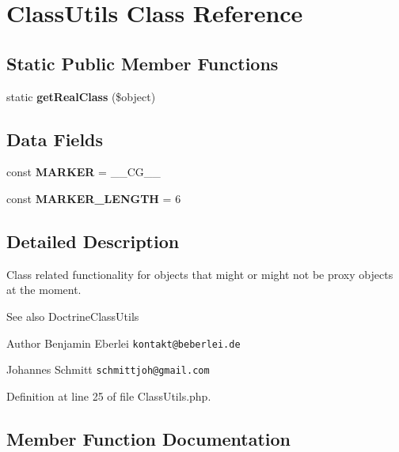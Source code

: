 \section{Class\+Utils Class Reference}
\label{class_symfony_1_1_component_1_1_security_1_1_core_1_1_util_1_1_class_utils}
\subsection*{Static Public Member Functions}
\begin{DoxyCompactItemize}
\item 
static {\bf get\+Real\+Class} (\$object)
\end{DoxyCompactItemize}
\subsection*{Data Fields}
\begin{DoxyCompactItemize}
\item 
const {\bf M\+A\+R\+K\+E\+R} = \textquotesingle{}\+\_\+\+\_\+\+C\+G\+\_\+\+\_\+\textquotesingle{}
\item 
const {\bf M\+A\+R\+K\+E\+R\+\_\+\+L\+E\+N\+G\+T\+H} = 6
\end{DoxyCompactItemize}


\subsection{Detailed Description}
Class related functionality for objects that might or might not be proxy objects at the moment.

\begin{DoxySeeAlso}{See also}
Doctrine\+Class\+Utils
\end{DoxySeeAlso}
\begin{DoxyAuthor}{Author}
Benjamin Eberlei {\tt kontakt@beberlei.\+de} 

Johannes Schmitt {\tt schmittjoh@gmail.\+com} 
\end{DoxyAuthor}


Definition at line 25 of file Class\+Utils.\+php.



\subsection{Member Function Documentation}
